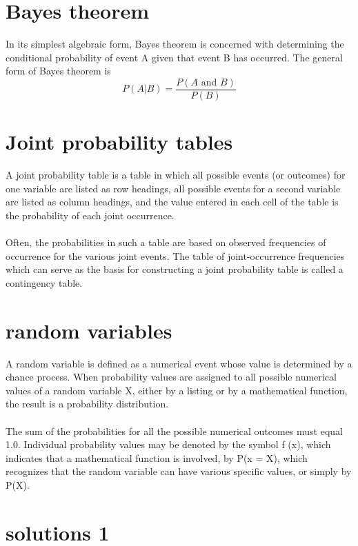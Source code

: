 \documentclass[12pt]{article}
\begin{document}
\section{Bayes theorem}
In its simplest algebraic form, Bayes theorem is concerned with determining the conditional probability of
event A given that event B has occurred. The general form of Bayes theorem is
\[ P(A|B) =
\frac{P(A \mbox{ and }B)}{P(B)} \]

\section{Joint probability tables}
A joint probability table is a table in which all possible events (or outcomes) for one variable are listed as
row headings, all possible events for a second variable are listed as column headings, and the value entered in
each cell of the table is the probability of each joint occurrence. 
\\
\\
\noindent Often, the probabilities in such a table are based
on observed frequencies of occurrence for the various joint events. The table
of joint-occurrence frequencies which can serve as the basis for constructing a joint probability table is called a
contingency table.

\section{random variables}
A random variable is defined as a numerical event whose value is determined by a chance process.
When probability values are assigned to all possible numerical values of a random variable X, either by a listing
or by a mathematical function, the result is a probability distribution. \\
\\
The sum of the probabilities for all the possible numerical outcomes must equal 1.0. Individual probability values may be denoted by the symbol f (x),
which indicates that a mathematical function is involved, by P(x = X), which recognizes that the random
variable can have various specific values, or simply by P(X).


\section{solutions 1}
\end{document}

